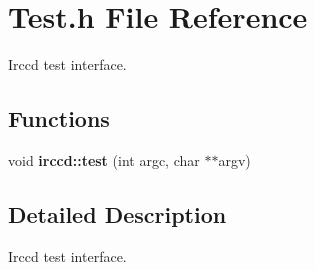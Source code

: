 \hypertarget{a00147}{\section{Test.\-h File Reference}
\label{a00147}
}


Irccd test interface.  


\subsection*{Functions}
\begin{DoxyCompactItemize}
\item 
void {\bfseries irccd\-::test} (int argc, char $\ast$$\ast$argv)
\end{DoxyCompactItemize}


\subsection{Detailed Description}
Irccd test interface. 
